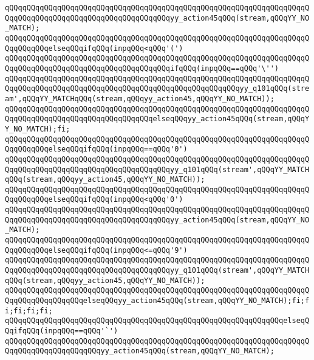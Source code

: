 \verb|qQQqqQQqqQQqqQQqqQQqqQQqqQQqqQQqqQQqqQQqqQQqqQQqqQQqqQQqqQQqqQQqqQQqqQQqqQQqqQQqqQQqqQQqqQQqqQQqqQQqqQQqqQQqyy_action45qQQq(stream,qQQqYY_NO_MATCH);|\newline
\verb|qQQqqQQqqQQqqQQqqQQqqQQqqQQqqQQqqQQqqQQqqQQqqQQqqQQqqQQqqQQqqQQqqQQqqQQqqQQqqQQqelseqQQqifqQQq(inpqQQq<qQQq'(')|\newline
\verb|qQQqqQQqqQQqqQQqqQQqqQQqqQQqqQQqqQQqqQQqqQQqqQQqqQQqqQQqqQQqqQQqqQQqqQQqqQQqqQQqqQQqqQQqqQQqqQQqqQQqqQQqqQQqifqQQq(inpqQQq==qQQq'\'')|\newline
\verb|qQQqqQQqqQQqqQQqqQQqqQQqqQQqqQQqqQQqqQQqqQQqqQQqqQQqqQQqqQQqqQQqqQQqqQQqqQQqqQQqqQQqqQQqqQQqqQQqqQQqqQQqqQQqqQQqqQQqqQQqqQQqyy_q101qQQq(stream',qQQqYY_MATCHqQQq(stream,qQQqyy_action45,qQQqYY_NO_MATCH));|\newline
\verb|qQQqqQQqqQQqqQQqqQQqqQQqqQQqqQQqqQQqqQQqqQQqqQQqqQQqqQQqqQQqqQQqqQQqqQQqqQQqqQQqqQQqqQQqqQQqqQQqqQQqqQQqelseqQQqyy_action45qQQq(stream,qQQqYY_NO_MATCH);fi;|\newline
\verb|qQQqqQQqqQQqqQQqqQQqqQQqqQQqqQQqqQQqqQQqqQQqqQQqqQQqqQQqqQQqqQQqqQQqqQQqqQQqqQQqelseqQQqifqQQq(inpqQQq==qQQq'0')|\newline
\verb|qQQqqQQqqQQqqQQqqQQqqQQqqQQqqQQqqQQqqQQqqQQqqQQqqQQqqQQqqQQqqQQqqQQqqQQqqQQqqQQqqQQqqQQqqQQqqQQqqQQqqQQqqQQqyy_q101qQQq(stream',qQQqYY_MATCHqQQq(stream,qQQqyy_action45,qQQqYY_NO_MATCH));|\newline
\verb|qQQqqQQqqQQqqQQqqQQqqQQqqQQqqQQqqQQqqQQqqQQqqQQqqQQqqQQqqQQqqQQqqQQqqQQqqQQqqQQqelseqQQqifqQQq(inpqQQq<qQQq'0')|\newline
\verb|qQQqqQQqqQQqqQQqqQQqqQQqqQQqqQQqqQQqqQQqqQQqqQQqqQQqqQQqqQQqqQQqqQQqqQQqqQQqqQQqqQQqqQQqqQQqqQQqqQQqqQQqqQQqyy_action45qQQq(stream,qQQqYY_NO_MATCH);|\newline
\verb|qQQqqQQqqQQqqQQqqQQqqQQqqQQqqQQqqQQqqQQqqQQqqQQqqQQqqQQqqQQqqQQqqQQqqQQqqQQqqQQqelseqQQqifqQQq(inpqQQq<=qQQq'9')|\newline
\verb|qQQqqQQqqQQqqQQqqQQqqQQqqQQqqQQqqQQqqQQqqQQqqQQqqQQqqQQqqQQqqQQqqQQqqQQqqQQqqQQqqQQqqQQqqQQqqQQqqQQqqQQqqQQqyy_q101qQQq(stream',qQQqYY_MATCHqQQq(stream,qQQqyy_action45,qQQqYY_NO_MATCH));|\newline
\verb|qQQqqQQqqQQqqQQqqQQqqQQqqQQqqQQqqQQqqQQqqQQqqQQqqQQqqQQqqQQqqQQqqQQqqQQqqQQqqQQqqQQqqQQqelseqQQqyy_action45qQQq(stream,qQQqYY_NO_MATCH);fi;fi;fi;fi;fi;|\newline
\verb|qQQqqQQqqQQqqQQqqQQqqQQqqQQqqQQqqQQqqQQqqQQqqQQqqQQqqQQqqQQqqQQqelseqQQqifqQQq(inpqQQq==qQQq'`')|\newline
\verb|qQQqqQQqqQQqqQQqqQQqqQQqqQQqqQQqqQQqqQQqqQQqqQQqqQQqqQQqqQQqqQQqqQQqqQQqqQQqqQQqqQQqqQQqqQQqyy_action45qQQq(stream,qQQqYY_NO_MATCH);|\newline
